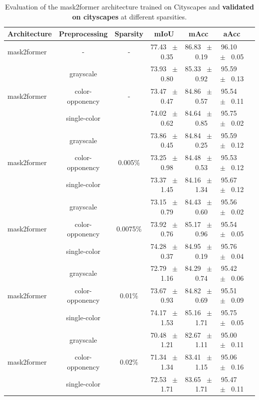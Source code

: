 \begin{table}[h]
  \centering
  \caption{Evaluation of the mask2former architecture trained on Cityscapes and \textbf{validated on cityscapes} at different sparsities.}
  \begin{tabular}{@{}lccc ccc@{}}
    \toprule
    Architecture & Preprocessing & Sparsity & mIoU & mAcc & aAcc \\
    \midrule
    mask2former & - & - & 77.43 ~$\pm$~ 0.35 & 86.83 ~$\pm$~ 0.19 & 96.10 ~$\pm$~ 0.05 \\
    \midrule
    \midrule
    \multirow{3}{*}{mask2former} & grayscale & \multirow{3}{*}{-} & 73.93 ~$\pm$~ 0.80 & 85.33 ~$\pm$~ 0.92 & 95.59 ~$\pm$~ 0.13 \\
    & color-opponency & & 73.47 ~$\pm$~ 0.47 & 84.86 ~$\pm$~ 0.57 & 95.54 ~$\pm$~ 0.11 \\
    & single-color & & 74.02 ~$\pm$~ 0.62 & 84.64 ~$\pm$~ 0.85 & 95.75 ~$\pm$~ 0.02 \\
    \midrule
    \multirow{3}{*}{mask2former} & grayscale & \multirow{3}{*}{0.005\%} & 73.86 ~$\pm$~ 0.45 & 84.84 ~$\pm$~ 0.25 & 95.59 ~$\pm$~ 0.12 \\
    & color-opponency & & 73.25 ~$\pm$~ 0.98 & 84.48 ~$\pm$~ 0.53 & 95.53 ~$\pm$~ 0.12 \\
    & single-color & & 73.37 ~$\pm$~ 1.45 & 84.16 ~$\pm$~ 1.34 & 95.67 ~$\pm$~ 0.12 \\
    \midrule
    \multirow{3}{*}{mask2former} & grayscale & \multirow{3}{*}{0.0075\%} & 73.15 ~$\pm$~ 0.79 & 84.43 ~$\pm$~ 0.60 & 95.56 ~$\pm$~ 0.02 \\
    & color-opponency & & 73.92 ~$\pm$~ 0.76 & 85.17 ~$\pm$~ 0.96 & 95.54 ~$\pm$~ 0.05 \\
    & single-color & & 74.28 ~$\pm$~ 0.37 & 84.95 ~$\pm$~ 0.19 & 95.76 ~$\pm$~ 0.04 \\
    \midrule
    \multirow{3}{*}{mask2former} & grayscale & \multirow{3}{*}{0.01\%} & 72.79 ~$\pm$~ 1.16 & 84.29 ~$\pm$~ 0.74 & 95.42 ~$\pm$~ 0.06 \\
    & color-opponency & & 73.67 ~$\pm$~ 0.93 & 84.82 ~$\pm$~ 0.69 & 95.51 ~$\pm$~ 0.09 \\
    & single-color & & 74.17 ~$\pm$~ 1.53 & 85.16 ~$\pm$~ 1.71 & 95.75 ~$\pm$~ 0.05 \\
    \midrule
    \multirow{3}{*}{mask2former} & grayscale & \multirow{3}{*}{0.02\%} & 70.48 ~$\pm$~ 1.21 & 82.67 ~$\pm$~ 1.11 & 95.00 ~$\pm$~ 0.11 \\
    & color-opponency & & 71.34 ~$\pm$~ 1.34 & 83.41 ~$\pm$~ 1.15 & 95.06 ~$\pm$~ 0.16 \\
    & single-color & & 72.53 ~$\pm$~ 1.71 & 83.65 ~$\pm$~ 1.71 & 95.47 ~$\pm$~ 0.11 \\
    \midrule
    \bottomrule
  \end{tabular}
  \label{tab:sparse_mask2former_cityscapes}
\end{table}